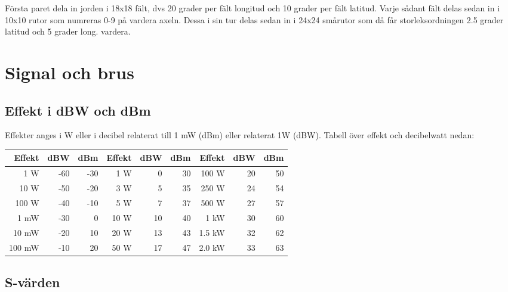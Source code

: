 Första paret dela in jorden i 18x18 fält, dvs 20 grader per fält longitud och 10 grader per fält latitud. Varje sådant fält delas sedan in i 10x10 rutor som numreras 0-9 på vardera axeln. Dessa i sin tur delas sedan in i 24x24 smårutor som då får storleksordningen 2.5 grader latitud och 5 grader long. vardera.

\section{Signal och brus}

\subsection{Effekt i dBW och dBm}

Effekter anges i W eller i decibel relaterat till 1 mW (dBm) eller relaterat 1W (dBW). Tabell över effekt och decibelwatt nedan:
\begin{center}
\begin{tabular}{rrr|rrr|rrr}
	   \textbf{Effekt} & \textbf{dBW} & \textbf{dBm} & \textbf{Effekt} & \textbf{dBW} & \textbf{dBm} & \textbf{Effekt} & \textbf{dBW} & \textbf{dBm} \\ \hline
	  1 \textmu W &          -60 &          -30 &        1 W &            0 &           30 &      100 W &           20 &           50 \\
	 10 \textmu W &          -50 &          -20 &        3 W &            5 &           35 &      250 W &           24 &           54 \\
	100 \textmu W &          -40 &          -10 &        5 W &            7 &           37 &      500 W &           27 &           57 \\
	         1 mW &          -30 &            0 &       10 W &           10 &           40 &       1 kW &           30 &           60 \\
	        10 mW &          -20 &           10 &       20 W &           13 &           43 &     1.5 kW &           32 &           62 \\
	       100 mW &          -10 &           20 &       50 W &           17 &           47 &     2.0 kW &           33 &           63
\end{tabular}
\end{center}

\subsection{S-värden}

